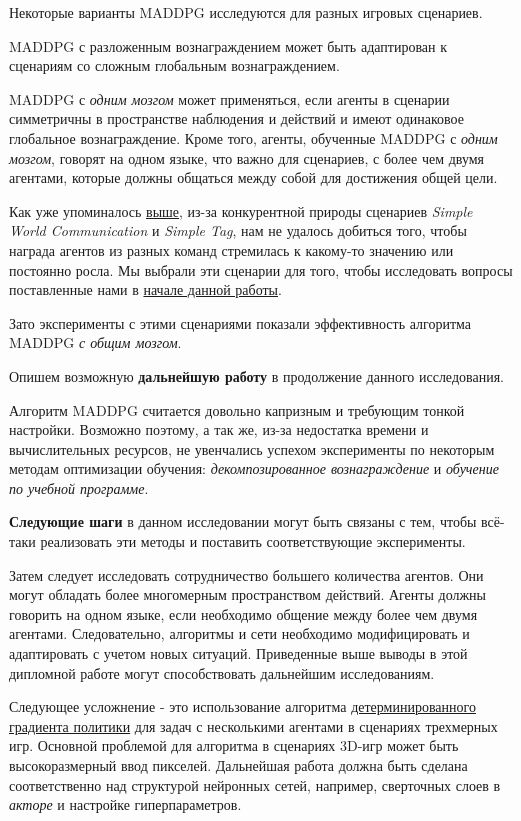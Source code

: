 Некоторые варианты MADDPG исследуются для разных игровых сценариев.

MADDPG с разложенным вознаграждением может быть адаптирован к сценариям со сложным глобальным вознаграждением.

MADDPG с \textit{одним мозгом} может применяться, если агенты в сценарии симметричны в пространстве наблюдения и действий и имеют одинаковое глобальное вознаграждение. Кроме того, агенты, обученные MADDPG с \textit{одним мозгом}, говорят на одном языке, что важно для сценариев, с более чем двумя агентами, которые должны общаться между собой для достижения общей цели.

Как уже упоминалось \hyperref[exp-results-svc]{выше}, из-за конкурентной природы сценариев \textit{Simple World Communication} и \textit{Simple Tag}, нам не удалось добиться того, чтобы награда агентов из разных команд стремилась к какому-то значению или постоянно росла. Мы выбрали эти сценарии для того, чтобы исследовать вопросы поставленные нами в \hyperref[intro-questions]{начале данной работы}.

Зато эксперименты с этими сценариями показали эффективность алгоритма MADDPG \textit{с общим мозгом}.

Опишем возможную \textbf{дальнейшую работу} в продолжение данного исследования.

Алгоритм MADDPG считается довольно капризным и требующим тонкой настройки. Возможно поэтому, а так же, из-за недостатка времени и вычислительных ресурсов, не увенчались успехом эксперименты по некоторым методам оптимизации обучения: \textit{декомпозированное вознаграждение} и \textit{обучение по учебной программе}.

\textbf{Следующие шаги} в данном исследовании могут быть связаны с тем, чтобы всё-таки реализовать эти методы и поставить соответствующие эксперименты.

Затем следует исследовать сотрудничество большего количества агентов. Они могут обладать более многомерным пространством действий. Агенты должны говорить на одном языке, если необходимо общение между более чем двумя агентами. Следовательно, алгоритмы и сети необходимо модифицировать и адаптировать с учетом новых ситуаций. Приведенные выше выводы в этой дипломной работе могут способствовать дальнейшим исследованиям.

Следующее усложнение - это использование алгоритма \hyperref[acr:dpg]{детерминированного градиента политики} для задач с несколькими агентами в сценариях трехмерных игр. Основной проблемой для алгоритма в сценариях 3D-игр может быть высокоразмерный ввод пикселей. Дальнейшая работа должна быть сделана соответственно над структурой нейронных сетей, например, сверточных слоев в \textit{акторе} и настройке гиперпараметров.

